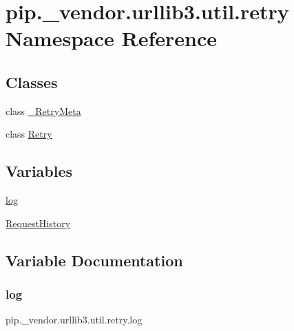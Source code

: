 \hypertarget{namespacepip_1_1__vendor_1_1urllib3_1_1util_1_1retry}{}\section{pip.\+\_\+vendor.\+urllib3.\+util.\+retry Namespace Reference}
\label{namespacepip_1_1__vendor_1_1urllib3_1_1util_1_1retry}
\subsection*{Classes}
\begin{DoxyCompactItemize}
\item 
class \hyperlink{classpip_1_1__vendor_1_1urllib3_1_1util_1_1retry_1_1__RetryMeta}{\+\_\+\+Retry\+Meta}
\item 
class \hyperlink{classpip_1_1__vendor_1_1urllib3_1_1util_1_1retry_1_1Retry}{Retry}
\end{DoxyCompactItemize}
\subsection*{Variables}
\begin{DoxyCompactItemize}
\item 
\hyperlink{namespacepip_1_1__vendor_1_1urllib3_1_1util_1_1retry_a79b25d6bc0cb641086a1e89bcde0b28e}{log}
\item 
\hyperlink{namespacepip_1_1__vendor_1_1urllib3_1_1util_1_1retry_a44ddaab1bf9bc5d28ac7fc46f73ad757}{Request\+History}
\end{DoxyCompactItemize}


\subsection{Variable Documentation}
\mbox{\label{namespacepip_1_1__vendor_1_1urllib3_1_1util_1_1retry_a79b25d6bc0cb641086a1e89bcde0b28e}} 
\subsubsection{\texorpdfstring{log}{log}}
{\footnotesize\ttfamily pip.\+\_\+vendor.\+urllib3.\+util.\+retry.\+log}

